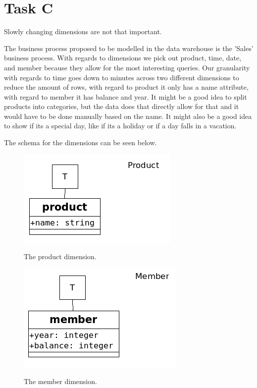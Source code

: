 	\section{Task C}
	Slowly changing dimensions are not that important.
	
	The business process proposed to be modelled in the data warehouse is the 'Sales' business process. With regards to dimensions we pick out product, time, date, and member because they allow for the most interesting queries. Our granularity with regards to time goes down to minutes across two different dimensions to reduce the amount of rows, with regard to product it only has a name attribute, with regard to member it has balance and year. It might be a good idea to split products into categories, but the data does that directly allow for that and it would have to be done manually based on the name. It might also be a good idea to show if its a special day, like if its a holiday or if a day falls in a vacation.
	
	The schema for the dimensions can be seen below. 
	
	\begin{minipage}{0.45\textwidth}
	\begin{figure}[H]
		\centering
		\includegraphics[scale=0.5]{dimensionProduct}
		\label{image:product}
		\caption{The product dimension.}
		\end{figure}
	\end{minipage}
	\begin{minipage}{0.45\textwidth}
	\begin{figure}[H]
	\centering
	\includegraphics[scale=0.5]{dimensionMember}
	\label{image:member}
	\caption{The member dimension.}
	\end{figure}
	\end{minipage}
	
